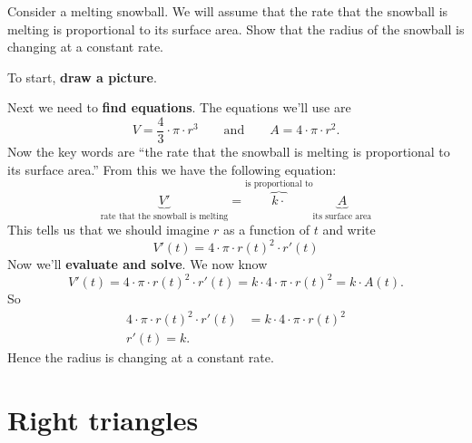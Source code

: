 \documentclass{ximera}
\begin{document}
\begin{example}
  Consider a melting snowball. We will assume that the rate that the
  snowball is melting is proportional to its surface area. Show that
  the radius of the snowball is changing at a constant rate.
  
\begin{explanation}
  To start, \textbf{draw a picture}.
  \begin{image}
  \end{image}
  Next we need to \textbf{find equations}. The equations we'll use are
  \[
  V = \frac{4}{3}\cdot \pi \cdot r^3 \qquad\text{and}\qquad A = 4\cdot
  \pi \cdot r^2.
  \]
  Now the key words are ``the rate that the snowball is melting is
  proportional to its surface area.'' From this we have the following
  equation:
  \[
  \underbrace{V'}_{\text{rate that the snowball is melting}} =
  \overbrace{k\cdot}^{\text{is proportional to}}
  \underbrace{A}_{\text{its surface area}}
  \]
  This tells us that we should imagine $r$ as a function of $t$ and write
  \[
  V'(t) = 4\cdot \pi\cdot r(t)^2 \cdot r'(t)
  \]
  Now we'll \textbf{evaluate and solve}. We now know
  \[
  V'(t) = 4\cdot \pi \cdot r(t)^2 \cdot r'(t) =  k\cdot 4\cdot
  \pi \cdot r(t)^2 = k\cdot A(t).
  \]
  So
  \begin{align*}
  4\cdot \pi \cdot r(t)^2 \cdot r'(t) &=  k\cdot 4\cdot
  \pi \cdot r(t)^2\\
  r'(t) = k.
  \end{align*}
  Hence the radius is changing at a constant rate. 
\end{explanation}
\end{example}





\section{Right triangles}
\end{document}
